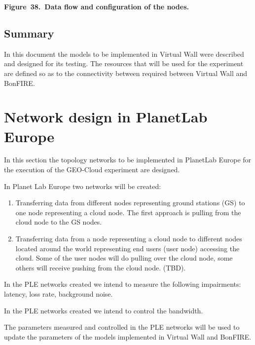 \documentclass[a4paper]{article}
\newcounter{saveenum}
\newcommand\liststyleLFOxxxviii{%
\renewcommand\theenumi{\alph{enumi}}
\renewcommand\theenumii{\alph{enumii}}
\renewcommand\theenumiii{\roman{enumiii}}
\renewcommand\theenumiv{\arabic{enumiv}}
\renewcommand\labelenumi{\theenumi)}
\renewcommand\labelenumii{\theenumii.}
\renewcommand\labelenumiii{\theenumiii.}
\renewcommand\labelenumiv{\theenumiv.}
}
\begin{document}
{\centering\bfseries
Figure\ 38.\ Data flow and configuration of the nodes.
\par}


\bigskip

\subsection[Summary]{Summary}
\hypertarget{Toc381777241}{}
\bigskip

In this document the models to be implemented in Virtual Wall were
described and designed for its testing. The resources that will be used
for the experiment are defined so as to the connectivity between
required between Virtual Wall and BonFIRE.

\section[Network design in PlanetLab Europe]{Network design in PlanetLab
Europe}
\label{bkm:Ref378931923}\hypertarget{Toc381777242}{}
\bigskip

In this section the topology networks to be implemented in PlanetLab
Europe for the execution of the GEO-Cloud experiment are designed.\ 


\bigskip

In Planet Lab Europe two networks will be created:

\liststyleLFOxxxviii
\setcounter{saveenum}{\value{enumi}}
\begin{enumerate}
\setcounter{enumi}{\value{saveenum}}
\item Transferring data from different nodes representing ground
stations (GS) to one node representing a cloud node. The first approach
is pulling from the cloud node to the GS nodes.
\item Transferring data from a node representing a cloud node to
different nodes located around the world representing end users (user
node) accessing the cloud. Some of the user nodes will do pulling over
the cloud node, some others will receive pushing from the cloud node.
(TBD).\ 
\end{enumerate}
In the PLE networks created we intend to measure the following
impairments: latency, loss rate, background noise.\ 


\bigskip

In the PLE networks created we intend to control the bandwidth.\ 


\bigskip

The parameters measured and controlled in the PLE networks will be used
to update the parameters of the models implemented in Virtual Wall and
BonFIRE.
\end{document}
